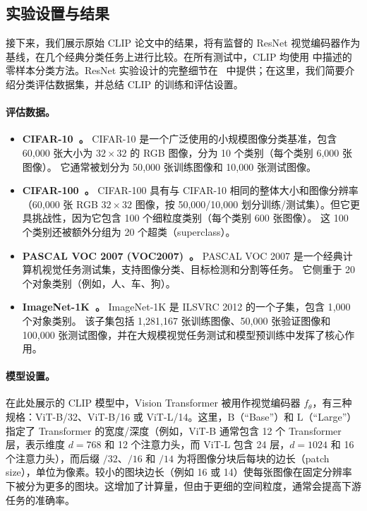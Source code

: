 \documentclass[../../book-main_zh.tex]{subfiles}
\begin{document}
\subsection{实验设置与结果}

接下来，我们展示原始 CLIP 论文中的结果，将有监督的 ResNet 视觉编码器作为基线，在几个经典分类任务上进行比较。在所有测试中，CLIP 均使用  中描述的零样本分类方法。ResNet 实验设计的完整细节在~\citep{He2016-lc} 中提供；在这里，我们简要介绍分类评估数据集，并总结 CLIP 的训练和评估设置。

\paragraph{评估数据。}
\begin{itemize}
    \item \textbf{CIFAR-10~\citep{krizhevsky2009learning}。}
    CIFAR-10 是一个广泛使用的小规模图像分类基准，包含 60{,}000 张大小为 \(32\times 32\) 的 RGB 图像，分为 10 个类别（每个类别 6{,}000 张图像）。
    它通常被划分为 50{,}000 张训练图像和 10{,}000 张测试图像。

    \item \textbf{CIFAR-100~\citep{krizhevsky2009learning}。}
    CIFAR-100 具有与 CIFAR-10 相同的整体大小和图像分辨率（60{,}000 张 RGB \(32\times 32\) 图像，按 50{,}000/10{,}000 划分训练/测试集）。但它更具挑战性，因为它包含 100 个细粒度类别（每个类别 600 张图像）。
    这 100 个类别还被额外分组为 20 个超类（superclass）。

    \item \textbf{PASCAL VOC 2007 (VOC2007)~\citep{everingham2010pascal}。}
    PASCAL VOC 2007 是一个经典计算机视觉任务测试集，支持图像分类、目标检测和分割等任务。
    它侧重于 20 个对象类别（例如，人、车、狗）。

    \item \textbf{ImageNet-1K~\citep{imagenet_cvpr09}。}
    ImageNet-1K 是 ILSVRC 2012 的一个子集，包含 1{,}000 个对象类别。
    该子集包括 1{,}281{,}167 张训练图像、50{,}000 张验证图像和 100{,}000 张测试图像，并在大规模视觉任务测试和模型预训练中发挥了核心作用。
\end{itemize}

\paragraph{模型设置。}
在此处展示的 CLIP 模型中，Vision Transformer 被用作视觉编码器 \(f_{\theta}\)，有三种规格：ViT-B/32、ViT-B/16 或 ViT-L/14。这里，\(\text{B}\)（“Base”）和 \(\text{L}\)（“Large”）指定了 Transformer 的宽度/深度（例如，ViT-B 通常包含 12 个 Transformer 层，表示维度 \(d=768\) 和 12 个注意力头，而 ViT-L 包含 24 层，\(d=1024\) 和 16 个注意力头），而后缀 \(/32\)、\(/16\) 和 \(/14\) 为将图像分块后每块的边长（patch size），单位为像素。较小的图块边长（例如 16 或 14）使每张图像在固定分辨率下被分为更多的图块。这增加了计算量，但由于更细的空间粒度，通常会提高下游任务的准确率。
\end{document}
